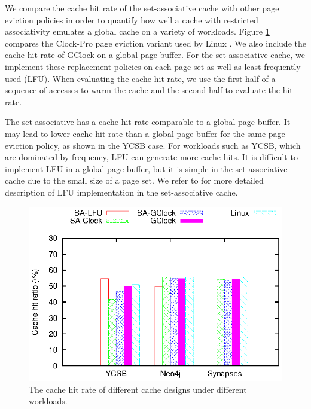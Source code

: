 We compare the cache hit rate of the set-associative cache with other page eviction
policies in order to quantify how well a cache with restricted associativity
emulates a global cache \cite{Sen02} on a variety of workloads.  
Figure \ref{cache_hits} compares the Clock-Pro page eviction
variant used by Linux \cite{clockpro}.
We also include the cache hit rate of GClock \cite{gclock} on a global
page buffer.   For the set-associative cache, we implement these replacement
policies on each page set as well as least-frequently used (LFU).
When evaluating the cache
hit rate, we use the first half of a sequence of accesses to warm the cache
and the second half to evaluate the hit rate.

The set-associative has a cache hit rate comparable to a global page buffer.
It may lead to lower cache hit rate than a global page
buffer for the same page eviction policy, as shown in the YCSB case.
For workloads such as YCSB, which are 
dominated by frequency, LFU can generate more cache hits. It is difficult
to implement LFU in a global page buffer, but it is simple in the set-associative cache
due to the small size of a page set. We refer to \cite{hotstorage12} for
more detailed description of LFU implementation in the set-associative cache.

\begin{figure}[tb]
\begin{center}
\includegraphics{figs/SAFS/cache-hit.eps}
\caption{The cache hit rate of different cache designs under different workloads.}
\label{cache_hits}
\end{center}
\end{figure}

